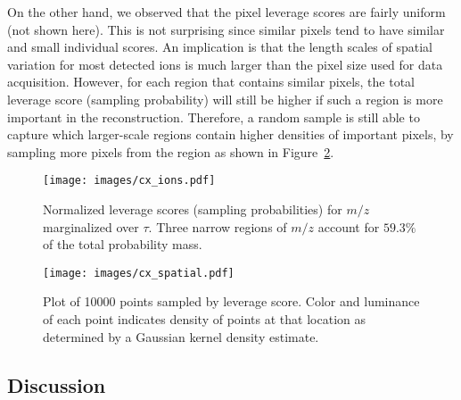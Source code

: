   On the other hand, we observed that the pixel leverage scores are fairly uniform (not shown here). This is not surprising since similar pixels tend to have similar and small individual scores.  An implication is that the length scales of spatial variation for most detected ions is much larger than the pixel size used for data acquisition.   However, for each region that contains similar pixels, the total leverage score (sampling probability) will still be higher if such a region is more important in the reconstruction. Therefore, a random sample is still able to capture which larger-scale regions contain higher densities of important pixels, by sampling more pixels from the region as shown in Figure~\ref{fig:cx_spatial}.
  
    \begin{figure} [h!btp]
    \begin{centering}
    \texttt{[image: images/cx\_ions.pdf]}
    \end{centering}
    \caption{Normalized leverage scores (sampling probabilities) for $m/z$ marginalized over $\tau$.
      Three narrow regions of $m/z$ account for $59.3\%$ of the total probability mass.}
    \label{fig:cx_ions}
    \end{figure} 
    
    \begin{figure} [h!btp]
    \begin{centering}
    \texttt{[image: images/cx\_spatial.pdf]}
    \end{centering}
    \caption{Plot of 10000 points sampled by leverage score. Color and
      luminance of each point indicates density of points at that location as
      determined by a Gaussian kernel density estimate.}
    \label{fig:cx_spatial}
    \end{figure} 


  \subsection{Discussion}
  \label{sect:lessons}
  
  

